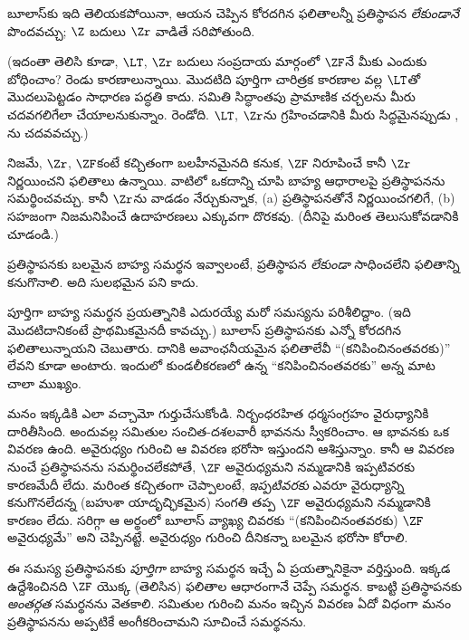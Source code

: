 \documentclass[../../../include/open-logic-section]{subfiles}
\begin{document}
బూలాస్‌కు ఇది తెలియకపోయినా, ఆయన చెప్పిన కోరదగిన ఫలితాలన్నీ ప్రతిస్థాపన \emph{లేకుండానే} పొందవచ్చు; $\Z$ బదులు $\Zr$ వాడితే సరిపోతుంది.

(ఇదంతా తెలిసి కూడా, $\LT$, $\Zr$ బదులు సంప్రదాయ మార్గంలో $\ZF$నే మీకు ఎందుకు బోధించాం? రెండు కారణాలున్నాయి. మొదటిది పూర్తిగా చారిత్రక కారణాల వల్ల $\LT$తో మొదలుపెట్టడం సాధారణ పద్ధతి కాదు. సమితి సిద్ధాంతపు ప్రామాణిక చర్చలను మీరు చదవగలిగేలా చేయాలనుకున్నాం. రెండోది. $\LT$, $\Zr$ను గ్రహించడానికి మీరు సిద్ధమైనప్పుడు \citealt{Potter2004}, \citealt{ButtonLT1}ను చదవవచ్చు.)

నిజమే, $\Zr$, $\ZF$కంటే కచ్చితంగా బలహీనమైనది కనుక, $\ZF$ నిరూపించే కానీ $\Zr$ నిర్ణయించని ఫలితాలు ఉన్నాయి. వాటిలో ఒకదాన్ని చూపి బాహ్య ఆధారాలపై ప్రతిస్థాపనను సమర్థించవచ్చు. కానీ $\Zr$ను వాడడం నేర్చుకున్నాక, (a) ప్రతిస్థాపనతోనే నిర్ణయించగలిగే, (b) సహజంగా నిజమనిపించే ఉదాహరణలు ఎక్కువగా దొరకవు. (దీనిపై మరింత తెలుసుకోవడానికి \citealt[\S13.2]{Potter2004} చూడండి.)

ప్రతిస్థాపనకు బలమైన బాహ్య సమర్థన ఇవ్వాలంటే, ప్రతిస్థాపన \emph{లేకుండా} సాధించలేని ఫలితాన్ని కనుగొనాలి. అది సులభమైన పని కాదు.

పూర్తిగా బాహ్య సమర్థన ప్రయత్నానికి ఎదురయ్యే మరో సమస్యను పరిశీలిద్దాం. (ఇది మొదటిదానికంటే ప్రాథమికమైనదీ కావచ్చు.) బూలాస్ ప్రతిస్థాపనకు ఎన్నో కోరదగిన ఫలితాలున్నాయని చెబుతారు.
దానికి అవాంఛనీయమైన ఫలితాలేవీ ``(కనిపించినంతవరకు)''
లేవని కూడా అంటారు. ఇందులో కుండలీకరణలో ఉన్న
``కనిపించినంతవరకు'' అన్న మాట చాలా ముఖ్యం.

మనం ఇక్కడికి ఎలా వచ్చామో గుర్తుచేసుకోండి. నిర్బంధరహిత ధర్మసంగ్రహం వైరుధ్యానికి దారితీసింది. అందువల్ల సమితుల సంచిత-దశలవారీ భావనను స్వీకరించాం. ఆ భావనకు ఒక వివరణ ఉంది. అవైరుధ్యం గురించి
ఆ వివరణ భరోసా ఇస్తుందని ఆశిస్తున్నాం. కానీ ఆ వివరణ నుంచే
ప్రతిస్థాపనను సమర్థించలేకపోతే, $\ZF$ అవైరుధ్యమని
నమ్మడానికి ఇప్పటివరకు కారణమేదీ లేదు. మరింత కచ్చితంగా
చెప్పాలంటే, \emph{ఇప్పటివరకు} ఎవరూ వైరుధ్యాన్ని
కనుగొనలేదన్న (బహుశా యాదృచ్ఛికమైన) సంగతి తప్ప
$\ZF$ అవైరుధ్యమని నమ్మడానికి కారణం లేదు. సరిగ్గా ఆ
అర్థంలో బూలాస్ వ్యాఖ్య చివరకు ``(కనిపించినంతవరకు) $\ZF$
అవైరుధ్యమే'' అని చెప్పినట్టే. అవైరుధ్యం గురించి దీనికన్నా
బలమైన భరోసా కోరాలి.

ఈ సమస్య ప్రతిస్థాపనకు \emph{పూర్తిగా} బాహ్య సమర్థన ఇచ్చే ఏ ప్రయత్నానికైనా వర్తిస్తుంది. ఇక్కడ ఉద్దేశించినది $\ZF$ యొక్క (తెలిసిన) ఫలితాల ఆధారంగానే చెప్పే సమర్థన. కాబట్టి ప్రతిస్థాపనకు \emph{అంతర్గత} సమర్థనను వెతకాలి. సమితుల గురించి మనం ఇచ్చిన వివరణ ఏదో విధంగా మనం ప్రతిస్థాపనను అప్పటికే అంగీకరించామని సూచించే సమర్థనను.
\end{document}
